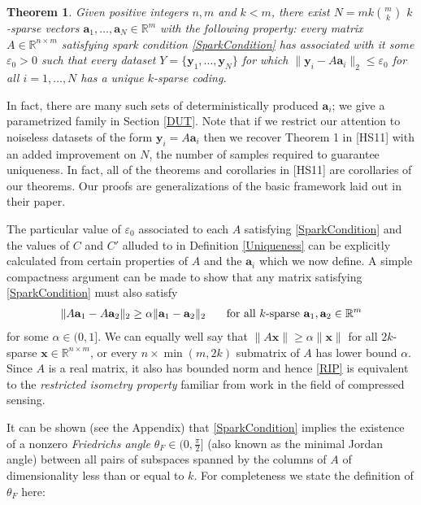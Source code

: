 \documentclass[journal, onecolumn]{IEEEtran}
\newtheorem{theorem}{Theorem}
\begin{document}

\begin{theorem}\label{DeterministicUniquenessTheorem}
Given positive integers $n, m$ and $k < m$, there exist $N =  mk{m \choose k}$ $k$-sparse vectors $\mathbf{a}_1, \ldots, \mathbf{a}_N \in \mathbb{R}^m$ with the following property: every matrix $A \in \mathbb{R}^{n \times m}$ satisfying spark condition \eqref{SparkCondition} has associated with it some $\varepsilon_0 > 0$ such that every dataset $Y = \{ \mathbf{y}_1, ..., \mathbf{y}_N \}$ for which $\| \mathbf{y}_i - A\mathbf{a}_i \|_2 \leq \varepsilon_0$ for all $i = 1, \ldots, N$ has a unique $k$-sparse coding. 
\end{theorem}

In fact, there are many such sets of deterministically produced $\mathbf{a}_i$; we give a parametrized family in Section \ref{DUT}. Note that if we restrict our attention to noiseless datasets of the form $\mathbf{y}_i = A\mathbf{a}_i$ then we recover Theorem 1 in [HS11] with an added improvement on $N$, the number of samples required to guarantee uniqueness. In fact, all of the theorems and corollaries in [HS11] are corollaries of our theorems. Our proofs are generalizations of the basic framework laid out in their paper.

The particular value of $\varepsilon_0$ associated to each $A$ satisfying \eqref{SparkCondition} and the values of $C$ and $C'$ alluded to in Definition \ref{Uniqueness} can be explicitly calculated from certain properties of $A$ and the $\mathbf{a}_i$ which we now define. A simple compactness argument can be made to show that any matrix satisfying \eqref{SparkCondition} must also satisfy
\begin{align}\label{RIP}
\|A\mathbf{a}_1 - A\mathbf{a}_2 \|_2 \geq  \alpha \|\mathbf{a}_1 - \mathbf{a}_2\|_2 \indent \text{ for all $k$-sparse } \mathbf{a}_1, \mathbf{a}_2 \in \mathbb{R}^m
\end{align}
%
for some $\alpha \in (0,1]$. We can equally well say that $\|A\mathbf{x}\| \geq \alpha\|\mathbf{x}\|$ for all $2k$-sparse $\mathbf{x} \in \mathbb{R}^{n \times m}$, or every $n \times \min(m,2k)$ submatrix of $A$ has lower bound $\alpha$. Since $A$ is a real matrix, it also has bounded norm and hence \eqref{RIP} is equivalent to the \emph{restricted isometry property} \cite{CandesTao05} familiar from work in the field of compressed sensing.

It can be shown (see the Appendix) that \eqref{SparkCondition} implies the existence of a nonzero \emph{Friedrichs angle} $\theta_F \in (0,\frac{\pi}{2}]$ (also known as the minimal Jordan angle) between all pairs of subspaces spanned by the columns of $A$ of dimensionality less than or equal to $k$. For completeness we state the definition of $\theta_F$ here:
\end{document}
